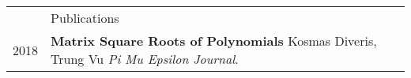 \documentclass[letterpaper, 11pt]{article}
\newcommand{\headingfont}{\Large\color{Red}}
\newenvironment{SectionTable}[1]{
	\renewcommand*{\arraystretch}{1.7}
	\setlength{\tabcolsep}{10pt}
	\begin{longtable}{Rp{5.2in}} & #1 \\}
	{\end{longtable}\vspace{-.3cm}}
\begin{document}
	\begin{SectionTable}{\headingfont Publications} 
		2018 & 
		\textbf{Matrix Square Roots of Polynomials} \newline
		Kosmas Diveris, Trung Vu \newline
		\textit{Pi Mu Epsilon Journal}. \\
		
		
		
	\end{SectionTable}
	
	
\end{document}
